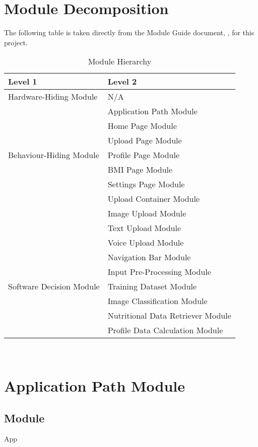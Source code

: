 \documentclass[12pt, titlepage]{article}
\begin{document}
\section{Module Decomposition}

The following table is taken directly from the Module Guide document, \cite{MG}, for this project.

\begin{table}[H]
	\centering
	\begin{tabular}{p{} p{}}
		\toprule
		\textbf{Level 1} & \textbf{Level 2}\\
		\midrule
		
		{Hardware-Hiding Module} & N/A \\
		\midrule
		
		\multirow{7}{0.3\textwidth}{Behaviour-Hiding Module} 
		& Application Path Module\\
		& Home Page Module\\
		& Upload Page Module\\
		& Profile Page Module\\
		& BMI Page Module\\
		& Settings Page Module\\
		& Upload Container Module \\
		& Image Upload Module\\
		& Text Upload Module \\
		& Voice Upload Module \\
		& Navigation Bar Module\\ 
		\midrule
		
		\multirow{3}{0.3\textwidth}{Software Decision Module} & Input Pre-Processing Module\\
		& Training Dataset Module\\
		& Image Classification Module\\
		& Nutritional Data Retriever Module\\
		& Profile Data Calculation Module\\
		\bottomrule
		
	\end{tabular}
	\caption{Module Hierarchy}
	\label{TblMH}
\end{table}

~\newpage

\section{Application Path Module} \label{App}
\subsection{Module}
App
\end{document}
